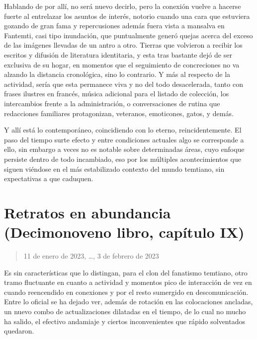 \documentclass[
]{book}
\begin{document}
Hablando de por allí, no será nuevo decirlo, pero la conexión vuelve a hacerse fuerte al entrelazar los asuntos de interés, notorio cuando una cara que estuviera gozando de gran fama y repercusiones además fuera vista a mansalva en Fantemti, casi tipo inundación, que puntualmente generó quejas acerca del exceso de las imágenes llevadas de un antro a otro. Tierras que volvieron a recibir los escritos y difusión de literatura identitaria, y esta tras bastante dejó de ser exclusiva de su hogar, en momentos que el seguimiento de concreciones no va alzando la distancia cronológica, sino lo contrario. Y más al respecto de la actividad, sería que esta permanece viva y no del todo desacelerada, tanto con frases ilustres en francés, música adicional para el listado de colección, los intercambios frente a la administración, o conversaciones de rutina que redacciones familiares protagonizan, veteranos, emoticones, gatos, y demás.

Y allí está lo contemporáneo, coincidiendo con lo eterno, reincidentemente. El paso del tiempo surte efecto y entre condiciones actuales algo se corresponde a ello, sin embargo a veces no es notable sobre determinadas áreas, cuyo enfoque persiste dentro de todo incambiado, eso por los múltiples acontecimientos que siguen viéndose en el más estabilizado contexto del mundo temtiano, sin expectativas a que caduquen.

\hypertarget{retratos-en-abundancia-decimonoveno-libro-capuxedtulo-ix}{%
\section{Retratos en abundancia (Decimonoveno libro, capítulo IX)}\label{retratos-en-abundancia-decimonoveno-libro-capuxedtulo-ix}}

\begin{quote}
11 de enero de 2023, \ldots, 3 de febrero de 2023
\end{quote}

Es sin características que lo distingan, para el clon del fanatismo temtiano, otro tramo fluctuante en cuanto a actividad y momentos pico de interacción de vez en cuando reencendido en conexiones y por el resto sumergido en descomunicación. Entre lo oficial se ha dejado ver, además de rotación en las colocaciones ancladas, un nuevo combo de actualizaciones dilatadas en el tiempo, de lo cual no mucho ha salido, el efectivo andamiaje y ciertos inconvenientes que rápido solventados quedaron.
\end{document}
